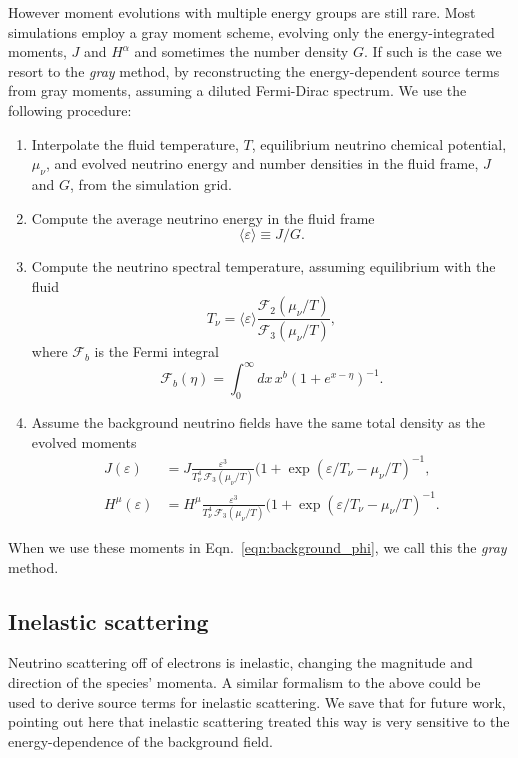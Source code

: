 \documentclass[aps,floatfix,prd,superscriptaddress,twocolumn]{revtex4-1}
\newcommand{\todo}[1]{\marginpar{\tiny{\textcolor{red}{#1}}}}
\begin{document}
However moment evolutions with multiple energy groups are still rare.
Most simulations employ a gray moment scheme,
evolving only the energy-integrated moments, $J$ and $H^\alpha$
and sometimes the number density $G$.
If such is the case we resort to the \emph{gray} method,
by reconstructing the energy-dependent source terms
from gray moments, assuming a diluted Fermi-Dirac spectrum.
We use the following procedure:
\begin{enumerate}
\item
  Interpolate the fluid temperature, $T$,
  equilibrium neutrino chemical potential, $\mu_\nu$,
  and evolved neutrino energy and number densities in the fluid frame,
  $J$ and $G$, from the simulation grid.
\item
  Compute the average neutrino energy in the fluid frame
  \begin{equation}
    \langle \varepsilon \rangle \equiv J/G.
  \end{equation}
\item
  Compute the neutrino spectral temperature, assuming equilibrium with the
  fluid
  \begin{equation}
    T_\nu = \langle \varepsilon \rangle
    \frac{\mathscr{F}_2(\mu_\nu/T)}{\mathscr{F}_3(\mu_\nu/T)},
  \end{equation}
  where $\mathscr{F}_b$ is the Fermi integral
  \begin{equation}
    \mathscr{F}_b(\eta) = \int_0^\infty dx \, x^b (1+e^{x-\eta})^{-1}.
  \end{equation}
\item
  Assume the background neutrino fields have the same total density
  as the evolved moments
  \begin{align}
    \label{eqn:J_from_gray}
    J(\varepsilon) &=
    J \frac{\varepsilon^3}{T_\nu^4 \,\mathscr{F}_3(\mu_\nu/T)}
    (1+\exp(\varepsilon/T_\nu-\mu_\nu/T)^{-1}, \\
    \label{eqn:H_from_gray}
    H^\mu(\varepsilon) &=
    H^\mu \frac{\varepsilon^3}{T_\nu^4\, \mathscr{F}_3(\mu_\nu/T)}
    (1+\exp(\varepsilon/T_\nu-\mu_\nu/T)^{-1}.
  \end{align}
\end{enumerate}
When we use these moments in Eqn.~\ref{eqn:background_phi},
we call this the \emph{gray} method.

\subsection{Inelastic scattering}
\label{ssec:sources_si}
Neutrino scattering off of electrons is inelastic, changing the
magnitude and direction of the species' momenta.
A similar formalism to the above could be used to derive source terms
for inelastic scattering.
\todo{compare relative amounts of inelastic to elastic scattering}
We save that for future work, pointing out here that inelastic scattering
treated this way is very sensitive to the energy-dependence of
the background field.
\end{document}
